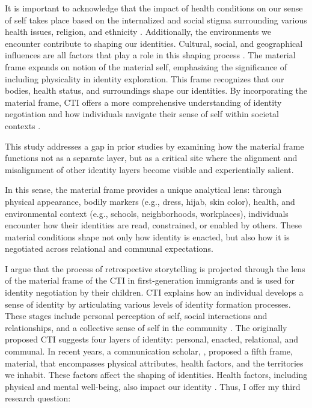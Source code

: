 It is important to acknowledge that the impact of health conditions on our sense of self takes place based on the internalized and social stigma surrounding various health issues, religion, and ethnicity \citep{kuiperCommunicationTheoryIdentity2021, catalanoSupportSocialcognitiveModel2021}. Additionally, the environments we encounter contribute to shaping our identities. Cultural, social, and geographical influences are all factors that play a role in this shaping process \citep{kuiperCommunicationTheoryIdentity2021}. The material frame expands on \citet{jamesConsciousnessSelf1890} notion of the material self, emphasizing the significance of including physicality in identity exploration. This frame recognizes that our bodies, health status, and surroundings shape our identities. By incorporating the material frame, CTI offers a more comprehensive understanding of identity negotiation and how individuals navigate their sense of self within societal contexts \citep{kuiperCommunicationTheoryIdentity2021}. 

This study addresses a gap in prior studies by examining how the material frame functions not as a separate layer, but as a critical site where the alignment and misalignment of other identity layers become visible and experientially salient.

In this sense, the material frame provides a unique analytical lens: through physical appearance, bodily markers (e.g., dress, hijab, skin color), health, and environmental context (e.g., schools, neighborhoods, workplaces), individuals encounter how their identities are read, constrained, or enabled by others. These material conditions shape not only how identity is enacted, but also how it is negotiated across relational and communal expectations.

I argue that the process of retrospective storytelling is projected through the lens of the material frame of the CTI in first-generation immigrants and is used for identity negotiation by their children. CTI explains how an individual develops a sense of identity by articulating various levels of identity formation processes. These stages include personal perception of self, social interactions and relationships, and a collective sense of self in the community \citep{shinCommunicationTheoryIdentity2017}. The originally proposed CTI suggests four layers of identity: personal, enacted, relational, and communal. In recent years, a communication scholar, \citet{kuiperCommunicationTheoryIdentity2021}, proposed a fifth frame, material, that encompasses physical attributes, health factors, and the territories we inhabit. These factors affect the shaping of identities. Health factors, including physical and mental well-being, also impact our identity \citep{kuiperCommunicationTheoryIdentity2021}. Thus, I offer my third research question:

